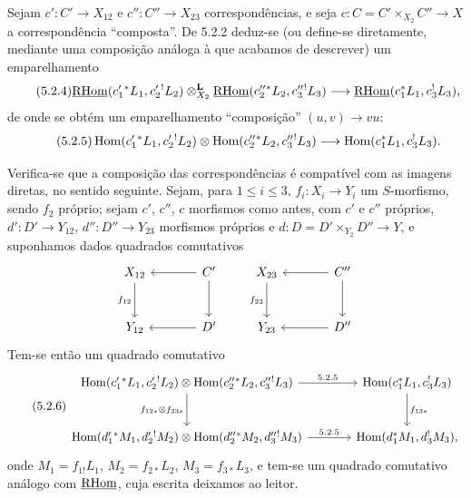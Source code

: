 Sejam $c':C'\to X_{12}$ e $c'':C''\to X_{23}$ correspondências, e seja $c:C=C'\times_{X_2}C''\to X$ a correspondência ``composta''. De 5.2.2 deduz-se (ou define-se diretamente, mediante uma composição análoga à que acabamos de descrever) um emparelhamento
\begin{equation}
\tag{5.2.4}
\underline{\mathrm{RHom}}(c_1'{}^*L_1,c_2'{}^!L_2)\otimes_{X_2}^{\mathbf L}\underline{\mathrm{RHom}}(c_2''{}^*L_2,c_3''{}^!L_3)
\longrightarrow\underline{\mathrm{RHom}}(c_1^*L_1,c_3^!L_3),
\end{equation}
de onde se obtém um emparelhamento ``composição'' $(u,v)\longrightarrow vu$:
\begin{equation}
\tag{5.2.5}
\operatorname{Hom}(c_1'{}^*L_1,c_2'{}^!L_2)\otimes\operatorname{Hom}(c_2''{}^*L_2,c_3''{}^!L_3)
\longrightarrow\operatorname{Hom}(c_1^*L_1,c_3^!L_3).
\end{equation}

Verifica-se que a composição das correspondências é compatível com as imagens diretas, no sentido seguinte. Sejam, para $1\leq i\leq 3$, $f_i:X_i\to Y_i$ um $S$-morfismo, sendo $f_2$ próprio; sejam $c'$, $c''$, $c$ morfismos como antes, com $c'$ e $c''$ próprios, $d':D'\to Y_{12}$, $d'':D''\to Y_{23}$ morfismos próprios e $d:D=D'\times_{Y_2}D''\to Y$, e suponhamos dados quadrados comutativos
\[
\begin{tikzcd}[column sep=large,row sep=large]
X_{12} \arrow[d,"f_{12}"'] & C' \arrow[l] \arrow[d] \\
Y_{12} & D' \arrow[l]
\end{tikzcd}
\qquad
\begin{tikzcd}[column sep=large,row sep=large]
X_{23} \arrow[d,"f_{23}"'] & C'' \arrow[l] \arrow[d] \\
Y_{23} & D'' \arrow[l]
\end{tikzcd}
\]
Tem-se então um quadrado comutativo
\begin{equation}
\tag{5.2.6}
\begin{tikzcd}[column sep=large,row sep=large]
\Hom(c_1'{}^*L_1,c_2'{}^!L_2)\otimes\Hom(c_2''{}^*L_2,c_3''{}^!L_3) \arrow[r,"5.2.5"] \arrow[d,"f_{12*}\otimes f_{23*}"']
& \Hom(c_1^*L_1,c_3^!L_3) \arrow[d,"f_{13*}"] \\
\Hom(d_1'{}^*M_1,d_2'{}^!M_2)\otimes\Hom(d_2''{}^*M_2,d_3''{}^!M_3) \arrow[r,"5.2.5"]
& \Hom(d_1^*M_1,d_3^!M_3),
\end{tikzcd}
\end{equation}
onde $M_1=f_{1!}L_1$, $M_2=f_{2*}L_2$, $M_3=f_{3*}L_3$, e tem-se um quadrado comutativo análogo com $\underline{\mathrm{RHom}}$, cuja escrita deixamos ao leitor.


